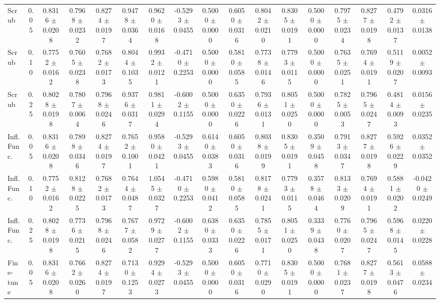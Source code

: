 \begin{table}[t]
\begin{tabular}{lcccccccccccccccc}
Scrub & 0.05 & 0.8316 $\pm$ 0.0208 & 0.7968 $\pm$ 0.0232 & 0.8274 $\pm$ 0.0197 & 0.9478 $\pm$ 0.0364 & 0.9620 $\pm$ 0.0168 & -0.5293 $\pm$ 0.0455 & 0.5000 $\pm$ 0.0000 & 0.6050 $\pm$ 0.0316 & 0.8042 $\pm$ 0.0210 & 0.8305 $\pm$ 0.0191 & 0.5000 $\pm$ 0.0000 & 0.7975 $\pm$ 0.0234 & 0.8277 $\pm$ 0.0198 & 0.4792 $\pm$ 0.0137 & 0.0316 $\pm$ 0.0138 \\
Scrub & 0.10 & 0.7752 $\pm$ 0.0162 & 0.7605 $\pm$ 0.0238 & 0.7682 $\pm$ 0.0173 & 0.8044 $\pm$ 0.1035 & 0.9932 $\pm$ 0.0121 & -0.4710 $\pm$ 0.2253 & 0.5000 $\pm$ 0.0000 & 0.5810 $\pm$ 0.0585 & 0.7738 $\pm$ 0.0146 & 0.7793 $\pm$ 0.0115 & 0.5000 $\pm$ 0.0000 & 0.7635 $\pm$ 0.0251 & 0.7694 $\pm$ 0.0191 & 0.5119 $\pm$ 0.0207 & 0.0052 $\pm$ 0.0093 \\
Scrub & 0.25 & 0.8028 $\pm$ 0.0198 & 0.7807 $\pm$ 0.0064 & 0.7968 $\pm$ 0.0246 & 0.9376 $\pm$ 0.0317 & 0.9811 $\pm$ 0.0294 & -0.6002 $\pm$ 0.1155 & 0.5000 $\pm$ 0.0000 & 0.6350 $\pm$ 0.0226 & 0.7936 $\pm$ 0.0131 & 0.8051 $\pm$ 0.0250 & 0.5000 $\pm$ 0.0000 & 0.7825 $\pm$ 0.0053 & 0.7965 $\pm$ 0.0247 & 0.4814 $\pm$ 0.0093 & 0.0156 $\pm$ 0.0235 \\
Infl. Func. & 0.05 & 0.8316 $\pm$ 0.0208 & 0.7898 $\pm$ 0.0346 & 0.8274 $\pm$ 0.0197 & 0.7652 $\pm$ 0.1001 & 0.9580 $\pm$ 0.0421 & -0.5293 $\pm$ 0.0455 & 0.6140 $\pm$ 0.0383 & 0.6050 $\pm$ 0.0316 & 0.8038 $\pm$ 0.0199 & 0.8305 $\pm$ 0.0191 & 0.3509 $\pm$ 0.0458 & 0.7913 $\pm$ 0.0347 & 0.8277 $\pm$ 0.0198 & 0.5926 $\pm$ 0.0229 & 0.0352 $\pm$ 0.0352 \\
Infl. Func. & 0.10 & 0.7752 $\pm$ 0.0162 & 0.8128 $\pm$ 0.0225 & 0.7682 $\pm$ 0.0173 & 0.7644 $\pm$ 0.0487 & 1.0545 $\pm$ 0.0327 & -0.4710 $\pm$ 0.2253 & 0.5980 $\pm$ 0.0412 & 0.5810 $\pm$ 0.0585 & 0.8178 $\pm$ 0.0241 & 0.7793 $\pm$ 0.0115 & 0.3578 $\pm$ 0.0464 & 0.8133 $\pm$ 0.0209 & 0.7694 $\pm$ 0.0191 & 0.5881 $\pm$ 0.0202 & -0.0420 $\pm$ 0.0249 \\
Infl. Func. & 0.25 & 0.8028 $\pm$ 0.0198 & 0.7736 $\pm$ 0.0215 & 0.7968 $\pm$ 0.0246 & 0.7677 $\pm$ 0.0582 & 0.9729 $\pm$ 0.0277 & -0.6002 $\pm$ 0.1155 & 0.6380 $\pm$ 0.0333 & 0.6350 $\pm$ 0.0226 & 0.7855 $\pm$ 0.0171 & 0.8051 $\pm$ 0.0250 & 0.3339 $\pm$ 0.0438 & 0.7760 $\pm$ 0.0207 & 0.7965 $\pm$ 0.0247 & 0.5968 $\pm$ 0.0145 & 0.0220 $\pm$ 0.0228 \\
Fine-tune & 0.05 & 0.8316 $\pm$ 0.0208 & 0.7662 $\pm$ 0.0260 & 0.8274 $\pm$ 0.0197 & 0.7130 $\pm$ 0.1253 & 0.9294 $\pm$ 0.0273 & -0.5293 $\pm$ 0.0455 & 0.5000 $\pm$ 0.0000 & 0.6050 $\pm$ 0.0316 & 0.7710 $\pm$ 0.0290 & 0.8305 $\pm$ 0.0191 & 0.5000 $\pm$ 0.0000 & 0.7681 $\pm$ 0.0237 & 0.8277 $\pm$ 0.0198 & 0.5613 $\pm$ 0.0476 & 0.0588 $\pm$ 0.0234 \\

\end{tabular}
\end{table}
